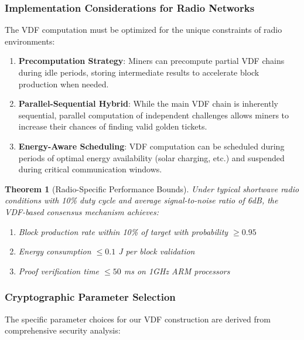 \documentclass[11pt,a4paper]{article}
\newtheorem{theorem}{Theorem}[section]
\begin{document}
\subsubsection{Implementation Considerations for Radio Networks}

The VDF computation must be optimized for the unique constraints of radio environments:

\begin{enumerate}
\item \textbf{Precomputation Strategy}: Miners can precompute partial VDF chains during idle periods, storing intermediate results to accelerate block production when needed.

\item \textbf{Parallel-Sequential Hybrid}: While the main VDF chain is inherently sequential, parallel computation of independent challenges allows miners to increase their chances of finding valid golden tickets.

\item \textbf{Energy-Aware Scheduling}: VDF computation can be scheduled during periods of optimal energy availability (solar charging, etc.) and suspended during critical communication windows.
\end{enumerate}

\begin{theorem}[Radio-Specific Performance Bounds]
Under typical shortwave radio conditions with 10\% duty cycle and average signal-to-noise ratio of 6dB, the VDF-based consensus mechanism achieves:
\begin{enumerate}
\item Block production rate within 10\% of target with probability $\geq 0.95$
\item Energy consumption $\leq 0.1$ J per block validation
\item Proof verification time $\leq 50$ ms on 1GHz ARM processors
\end{enumerate}
\end{theorem}

\subsubsection{Cryptographic Parameter Selection}

The specific parameter choices for our VDF construction are derived from comprehensive security analysis:
\end{document}
